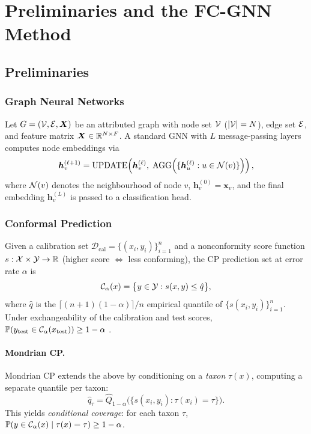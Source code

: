\section{Preliminaries and the FC-GNN Method}
\label{sec:method}

\subsection{Preliminaries}
\label{sec:prelim}

\subsubsection{Graph Neural Networks}

Let $G = (\mathcal{V}, \mathcal{E}, \bm{X})$ be an attributed graph with node set
$\mathcal{V}$ ($|\mathcal{V}|=N$), edge set $\mathcal{E}$, and feature matrix
$\bm{X} \in \mathbb{R}^{N \times F}$.
A standard GNN with $L$ message-passing layers computes node embeddings via
\[
  \bm{h}_v^{(\ell+1)}
  = \text{UPDATE}\!\left(\bm{h}_v^{(\ell)},\;
    \text{AGG}\!\left(\{\bm{h}_u^{(\ell)} : u \in \mathcal{N}(v)\}\right)\right),
\]
where $\mathcal{N}(v)$ denotes the neighbourhood of node $v$,
$\bm{h}_v^{(0)} = \bm{x}_v$, and the final embedding $\bm{h}_v^{(L)}$ is
passed to a classification head.

\subsubsection{Conformal Prediction}

Given a calibration set $\mathcal{D}_\text{cal} = \{(x_i, y_i)\}_{i=1}^n$
and a nonconformity score function $s : \mathcal{X} \times \mathcal{Y}
\to \mathbb{R}$ (higher score $\Leftrightarrow$ less conforming), the CP prediction
set at error rate $\alpha$ is
\[
  \mathcal{C}_\alpha(x) = \bigl\{y \in \mathcal{Y} : s(x,y) \le \hat{q}\bigr\},
\]
where $\hat{q}$ is the $\lceil (n+1)(1-\alpha) \rceil / n$ empirical
quantile of $\{s(x_i, y_i)\}_{i=1}^n$.
Under exchangeability of the calibration and test scores,
$\mathbb{P}(y_\text{test} \in \mathcal{C}_\alpha(x_\text{test})) \ge 1-\alpha$
\citep{angelopoulos21}.

\paragraph{Mondrian CP.}
Mondrian CP \citep{vovk05} extends the above by conditioning on a
\emph{taxon} $\tau(x)$, computing a separate quantile per taxon:
\[
  \hat{q}_\tau = \hat{Q}_{1-\alpha}\bigl(\{s(x_i,y_i) : \tau(x_i)=\tau\}\bigr).
\]
This yields \emph{conditional coverage}: for each taxon $\tau$,
$\mathbb{P}(y \in \mathcal{C}_\alpha(x) \mid \tau(x) = \tau) \ge 1-\alpha$.

